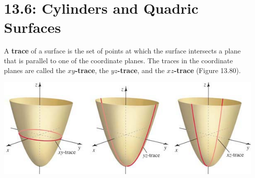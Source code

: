 \documentclass[mathNotesPreamble]{subfiles}
\begin{document}
\section{13.6: Cylinders and Quadric Surfaces}
  \begin{defn*}[Trace]
    A \textbf{trace} of a surface is the set of points at which the surface intersects a plane that is parallel to one of the coordinate planes. The traces in the coordinate planes are called the \textbf{$xy$-trace}, the \textbf{$yz$-trace}, and the \textbf{$xz$-trace} (Figure 13.80).
  \end{defn*}
  \begin{center}
    \includegraphics[width=0.75\linewidth]{images/briggs_13_06/fig13_80}
  \end{center}
  \pagebreak
  
\end{document}
